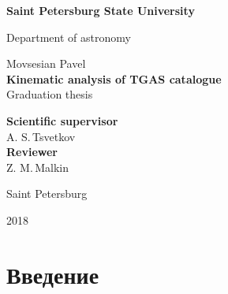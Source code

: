 \documentclass[14pt]{article} %
\begin{document}
\begin{titlepage}

\begin{center}
{\small \bf Saint Petersburg State University

Department of astronomy}
\end{center}

\vspace{2cm}
\begin{center}
Movsesian Pavel\\
  \large{\bf Kinematic analysis of TGAS catalogue}\\
Graduation thesis
 \end{center}

\vspace{3cm}

\hspace{8cm}\parbox{8cm}{	%

\footnotesize{{\bf Scientific supervisor}\\
A. S.\,Tsvetkov} \\  %

{\bf Reviewer}\\
Z. M.\,Malkin \\  %
}

\vfill %

\begin{center}
\small {Saint Petersburg

2018}
\end{center}

\end{titlepage}

\tableofcontents
\newpage

\section{Введение}
\end{document}
